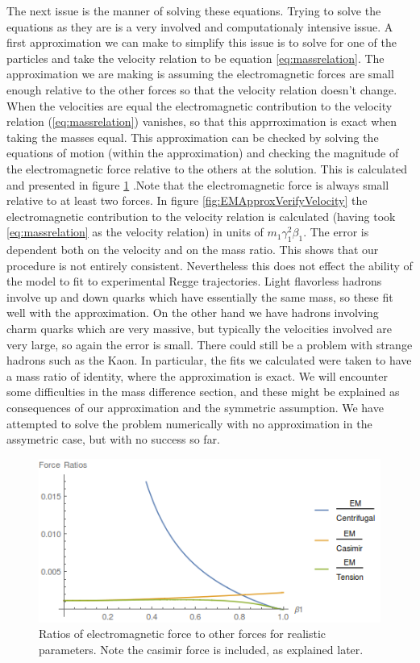 \documentclass[11pt,a4paper]{article}
\begin{document}
The next issue is the manner of solving these equations. Trying to solve the equations as they are is a very involved and computationaly intensive issue. A first approximation we can make to simplify this issue is to solve for one of the particles and take the velocity relation to be equation \ref{eq:massrelation}. The approximation we are making is assuming the electromagnetic forces are small enough relative to the other forces so that the velocity relation doesn't change. When the velocities are equal the electromagnetic contribution to the velocity relation (\ref{eq:massrelation}) vanishes, so that this apprroximation is exact when taking the masses equal. This approximation can be checked by solving the equations of motion (within the approximation) and checking the magnitude of the electromagnetic force relative to the others at the solution. This is calculated and presented in figure \ref{fig:EMApproxVerify} .Note that the electromagnetic force is always small relative to at least two forces. In figure \ref{fig:EMApproxVerifyVelocity} the electromagnetic contribution to the velocity relation is calculated (having took \ref{eq:massrelation} as the velocity relation) in units of $m_1\gamma_1^2\beta_1$. The error is dependent both on the velocity and on the mass ratio. This shows that our procedure is not entirely consistent. Nevertheless this does not effect the ability of the model to fit to experimental Regge trajectories. Light flavorless hadrons involve up and down quarks which have essentially the same mass, so these fit well with the approximation. On the other hand we have hadrons involving charm quarks which are very massive, but typically the velocities involved are very large, so again the error is small. There could still be a problem with strange hadrons such as the Kaon. In particular, the fits we calculated were taken to have a mass ratio of identity, where the approximation is exact. We will encounter some difficulties in the mass difference section, and these might be explained as consequences of our approximation and the symmetric assumption. We have attempted to solve the problem numerically with no approximation in the assymetric case, but with no success so far.

\begin{figure}[h]
\centering
\includegraphics[scale=0.7]{figures/VerifyEMApprox.png}
\caption{Ratios of electromagnetic force to other forces for realistic parameters. Note the casimir force is included, as explained later.}
\label{fig:EMApproxVerify}
\end{figure}
\end{document}
